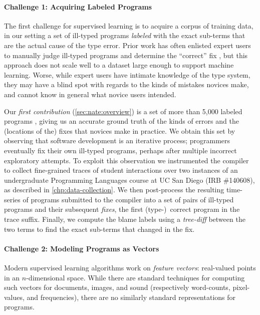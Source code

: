 \paragraph{Challenge 1: Acquiring Labeled Programs}
%
The first challenge for supervised learning
is to acquire a corpus of training data, in our setting
a set of ill-typed programs \emph{labeled}
with the exact sub-terms that are the actual
cause of the type error.
%
Prior work has often enlisted expert users
to manually judge ill-typed programs and
determine the ``correct'' fix
\citep[\eg][]{Lerner2007-dt,Loncaric2016-uk},
but this approach does not scale well to
a dataset large enough to support machine
learning.
%
Worse, while expert users have intimate
knowledge of the type system, they may
have a blind spot with regards to the
kinds of mistakes novices make, and
cannot know in general what novice users
intended.

Our \emph{first contribution} (\autoref{sec:nate:overview})
is a set of more than 5,000 labeled programs \citep{Seidel2017-ko},
giving us an accurate ground truth of
the kinds of errors and the (locations
of the) fixes that novices make in
practice.
%
We obtain this set by observing that
software development is an iterative
process; programmers eventually
fix their own ill-typed programs,
perhaps after multiple incorrect
exploratory attempts.
%
To exploit this observation we instrumented
the \ocaml compiler to collect fine-grained
traces of student interactions over two instances
of an undergraduate Programming Languages
course at UC San Diego (IRB \#140608),
as described in \autoref{chp:data-collection}.
%
We then post-process the resulting time-series
of programs submitted to the \ocaml compiler into
a set of pairs of ill-typed programs and their
subsequent \emph{fixes}, the first (type-)~correct
program in the trace suffix.
%
Finally, we compute the blame labels using a
\emph{tree-diff} between the two terms to find
the exact sub-terms that changed in the fix.

\paragraph{Challenge 2: Modeling Programs as Vectors}
%
Modern supervised learning algorithms work on %
\emph{feature vectors}: real-valued points in an
$n$-dimensional space. While there are standard
techniques for computing such
vectors for documents, images, and sound (respectively
word-counts, pixel-values, and frequencies),
there are no similarly standard representations for
programs.

